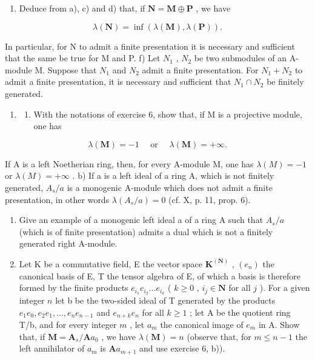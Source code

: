 \begin{enumerate}
\def\labelenumi{\alph{enumi})}
\setcounter{enumi}{4}
\tightlist
\item
  Deduce from a), c) and d) that, if \(\mathbf{N} = \mathbf{M} \oplus \mathbf{P}\) , we have
\end{enumerate}

\[
\lambda (\mathbf {N}) = \inf \left(\lambda (\mathbf {M}), \lambda (\mathbf {P})\right).
\]

In particular, for N to admit a finite presentation it is necessary and sufficient that the same be true for M and P. f) Let \(N_{1}\) , \(N_{2}\) be two submodules of an A-module M. Suppose that \(N_{1}\) and \(N_{2}\) admit a finite presentation. For \(N_{1} + N_{2}\) to admit a finite presentation, it is necessary and sufficient that \(N_{1} \cap N_{2}\) be finitely generated.

\begin{enumerate}
\def\labelenumi{\arabic{enumi})}
\setcounter{enumi}{6}
\tightlist
\item
  \begin{enumerate}
  \def\labelenumii{\alph{enumii})}
  \tightlist
  \item
    With the notations of exercise 6, show that, if M is a projective module, one has
  \end{enumerate}
\end{enumerate}

\[
\lambda (\mathbf {M}) = - 1 \quad \text { or } \quad \lambda (\mathbf {M}) = + \infty .
\]

If A is a left Noetherian ring, then, for every A-module M, one has \(\lambda(M) = -1\) or \(\lambda(M) = +\infty\) . b) If a is a left ideal of a ring A, which is not finitely generated, \(A_s/a\) is a monogenic A-module which does not admit a finite presentation, in other words \(\lambda(A_s/a) = 0\) (cf. X, p. 11, prop. 6).

\begin{enumerate}
\def\labelenumi{\alph{enumi})}
\setcounter{enumi}{2}
\item
  Give an example of a monogenic left ideal a of a ring A such that \(A_{s}/a\) (which is of finite presentation) admits a dual which is not a finitely generated right A-module.
\item
  Let K be a commutative field, E the vector space \(\mathbf{K}^{(\mathbf{N})}\) , \((e_n)\) the canonical basis of E, T the tensor algebra of E, of which a basis is therefore formed by the finite products \(e_{i_1} e_{i_2} \ldots e_{i_k}\) ( \(k \geqslant 0\) , \(i_j \in \mathbf{N}\) for all \(j\) ). For a given integer \(n\) let b be the two-sided ideal of T generated by the products \(e_1 e_0, e_2 e_1, \ldots, e_n e_{n-1}\) and \(e_{n+k} e_n\) for all \(k \geqslant 1\) ; let A be the quotient ring T/b, and for every integer \(m\) , let \(a_{m}\) the canonical image of \(e_{m}\) in A. Show that, if \(\mathbf{M} = \mathbf{A}_{s}/\mathbf{A}a_{0}\) , we have \(\lambda(\mathbf{M}) = n\) (observe that, for \(m \leqslant n - 1\) the left annihilator of \(a_{m}\) is \(\mathbf{A}a_{m+1}\) and use exercise 6, b)).
\end{enumerate}

